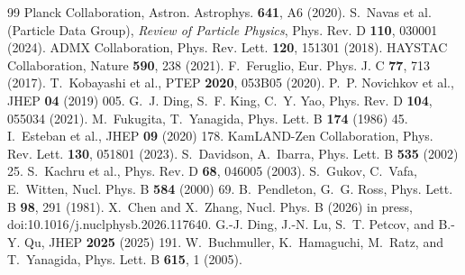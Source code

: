 \documentclass[12pt,a4paper]{article}
\numberwithin{equation}{section}
\begin{document}
\begin{thebibliography}{99}
 Planck Collaboration, Astron. Astrophys. \textbf{641}, A6 (2020).
 S.~Navas et al. (Particle Data Group), \emph{Review of Particle Physics}, Phys. Rev. D \textbf{110}, 030001 (2024).
 ADMX Collaboration, Phys. Rev. Lett. \textbf{120}, 151301 (2018).
 HAYSTAC Collaboration, Nature \textbf{590}, 238 (2021).
 F.~Feruglio, Eur. Phys. J. C \textbf{77}, 713 (2017).
 T.~Kobayashi et al., PTEP \textbf{2020}, 053B05 (2020).
 P.~P. Novichkov et al., JHEP \textbf{04} (2019) 005.
 G.~J. Ding, S.~F. King, C.~Y. Yao, Phys. Rev. D \textbf{104}, 055034 (2021).
 M.~Fukugita, T.~Yanagida, Phys. Lett. B \textbf{174} (1986) 45.
 I.~Esteban et al., JHEP \textbf{09} (2020) 178.
 KamLAND-Zen Collaboration, Phys. Rev. Lett. \textbf{130}, 051801 (2023).
 S.~Davidson, A.~Ibarra, Phys. Lett. B \textbf{535} (2002) 25.
 S.~Kachru et al., Phys. Rev. D \textbf{68}, 046005 (2003).
 S.~Gukov, C.~Vafa, E.~Witten, Nucl. Phys. B \textbf{584} (2000) 69.
 B.~Pendleton, G.~G. Ross, Phys. Lett. B \textbf{98}, 291 (1981).
 X.~Chen and X.~Zhang, Nucl. Phys. B (2026) in press, doi:10.1016/j.nuclphysb.2026.117640.
 G.-J. Ding, J.-N. Lu, S.~T. Petcov, and B.-Y. Qu, JHEP \textbf{2025} (2025) 191.
 W.~Buchmuller, K.~Hamaguchi, M.~Ratz, and T.~Yanagida, Phys. Lett. B \textbf{615}, 1 (2005).
\end{thebibliography}
\end{document}

